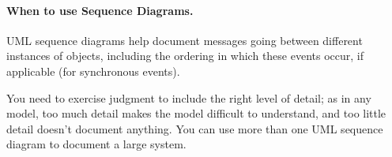 \paragraph{When to use Sequence Diagrams.} UML sequence
diagrams help document messages going between different instances of
objects, including the ordering in which these events occur, if
applicable (for synchronous events).

You need to exercise judgment to include the right level of detail;
as in any model, too much detail makes the model difficult to
understand, and too little detail doesn't document anything. You
can use more than one UML sequence diagram to document a large system.





